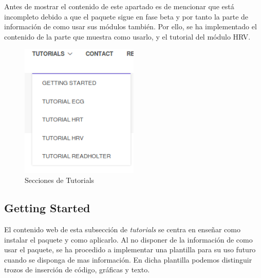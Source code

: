 Antes de mostrar el contenido de este apartado es de mencionar que está incompleto debido a que el paquete sigue en fase beta y por tanto la parte de información de como usar sus módulos también. Por ello, se ha implementado el contenido de la parte que muestra como usarlo, y el tutorial del módulo HRV. 

\begin{figure}[H]
    \centering
    \includegraphics[width=0.5\textwidth]{img/tutorials_panel.png}
    \caption{Secciones de Tutorials }
    \label{fig:tutoWebPanel}
\end{figure}





\subsection*{Getting Started}
El contenido web de esta subsección de \textit{tutorials} se centra en enseñar como instalar el paquete y como aplicarlo. Al no disponer de la información de como usar el paquete, se ha procedido a implementar una plantilla para su uso futuro cuando se disponga de mas información. En dicha plantilla podemos distinguir trozos de inserción de código, gráficas y texto. 

